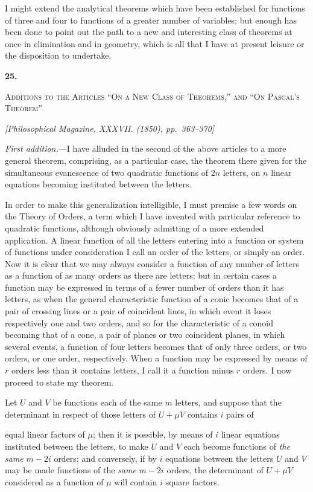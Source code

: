 \documentclass[11pt]{article}
\newcommand{\paperhead}[3]{%
  \clearpage
  \begin{center}
  {\Large\bfseries #1.}\par\vspace{0.85em}
  {\large\scshape #2}\par\vspace{0.6em}
  {\itshape [#3]}\par
  \end{center}\vspace{0.4em}}
\newcommand{\sourcepage}[1]{\marginpar{\scriptsize p.~#1}}
\begin{document}
I might extend the analytical theorems which have been established for functions of three and four to functions of a greater number of variables; but enough has been done to point out the path to a new and interesting class of theorems at once in elimination and in geometry, which is all that I have at present leisure or the disposition to undertake.

\paperhead{25}{Additions to the Articles ``On a New Class of Theorems,'' and ``On Pascal's Theorem''}{Philosophical Magazine, XXXVII. (1850), pp.~363--370}

\sourcepage{145}
\emph{First addition.}---I have alluded in the second of the above articles to a more general theorem, comprising, as a particular case, the theorem there given for the simultaneous evanescence of two quadratic functions of $2n$ letters, on $n$ linear equations becoming instituted between the letters.

In order to make this generalization intelligible, I must premise a few words on the Theory of Orders, a term which I have invented with particular reference to quadratic functions, although obviously admitting of a more extended application. A linear function of all the letters entering into a function or system of functions under consideration I call an order of the letters, or simply an order. Now it is clear that we may always consider a function of any number of letters as a function of as many orders as there are letters; but in certain cases a function may be expressed in terms of a fewer number of orders than it has letters, as when the general characteristic function of a conic becomes that of a pair of crossing lines or a pair of coincident lines, in which event it loses respectively one and two orders, and so for the characteristic of a conoid becoming that of a cone, a pair of planes or two coincident planes, in which several events, a function of four letters becomes that of only three orders, or two orders, or one order, respectively. When a function may be expressed by means of $r$ orders less than it contains letters, I call it a function minus $r$ orders. I now proceed to state my theorem.

Let $U$ and $V$ be functions each of the same $m$ letters, and suppose that the determinant in respect of those letters of $U+\mu V$ contains $i$ pairs of

\sourcepage{146}
equal linear factors of $\mu$; then it is possible, by means of $i$ linear equations instituted between the letters, to make $U$ and $V$ each become functions of \emph{the same} $m-2i$ orders; and conversely, if by $i$ equations between the letters $U$ and $V$ may be made functions of the \emph{same} $m-2i$ orders, the determinant of $U+\mu V$ considered as a function of $\mu$ will contain $i$ square factors.
\end{document}
